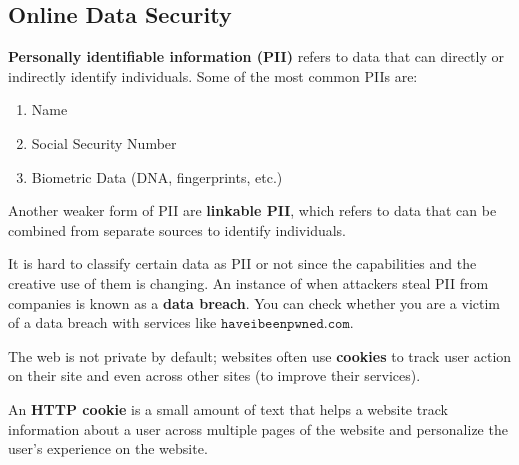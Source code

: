 \documentclass{article}
\newcounter{definition}[section]
\begin{document}
  \subsection{Online Data Security}

  \begin{definition}
    \label{def:personally-identifiable-information}
  \textbf{Personally identifiable information (PII)} refers to data that can directly or indirectly identify individuals. Some of the most common PIIs are: 
  \begin{enumerate}
      \item Name 
      \item Social Security Number
      \item Biometric Data (DNA, fingerprints, etc.)
  \end{enumerate}
  Another weaker form of PII are \textbf{linkable PII}, which refers to data that can be combined from separate sources to identify individuals. 
  \end{definition}

  It is hard to classify certain data as PII or not since the capabilities and the creative use of them is changing. An instance of when attackers steal PII from companies is known as a \textbf{data breach}. You can check whether you are a victim of a data breach with services like $\texttt{haveibeenpwned.com}$. 

  The web is not private by default; websites often use \textbf{cookies} to track user action on their site and even across other sites (to improve their services).

  \begin{definition}
    \label{def:http-cookie}
  An \textbf{HTTP cookie} is a small amount of text that helps a website track information about a user across multiple pages of the website and personalize the user's experience on the website. 
  \end{definition}
\end{document}
